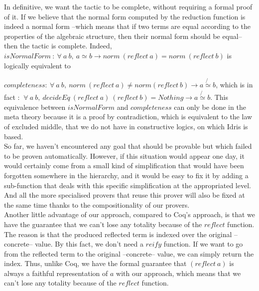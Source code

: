 In definitive, we want the tactic to be complete, without requiring a formal proof of it. If we believe that the normal form computed by the reduction function is indeed a normal form --which means that if two terms are equal according to the properties of the algebraic structure, then their normal form should be equal-- then the tactic is complete.
Indeed, 
$isNormalForm\ :\ \forall\ a\ b,\ a \simeq b \rightarrow norm\ (reflect\ a) = norm\ (reflect\ b)$ is logically equivalent to

$completeness : \ \forall\ a\ b,\ norm\ (reflect\ a) \neq norm(reflect\ b) \rightarrow a \not{\simeq} b$, which is in fact :
$\ \forall\ a\ b,\ decideEq\ (reflect\ a)\ (reflect\ b) = Nothing \rightarrow a \not{\simeq} b$.
This equivalence between $isNormalForm$ and $completeness$ can only be done in the meta theory because it is a proof by contradiction, which is equivalent to the law of excluded middle, that we do not have in constructive logics, on which Idris is based.
\\

So far, we haven't encountered any goal that should be provable but which failed to be proven automatically. However, if this situation would appear one day, it would certainly come from a small kind of simplification that would have been forgotten somewhere in the hierarchy, and it would be easy to fix it by adding a sub-function that deals with this specific simplification at the appropriated level. And all the more specialised provers that reuse this prover will also be fixed at the same time thanks to the compositionality of our provers. 
\\

Another little advantage of our approach, compared to Coq's approach, is that we have the guarantee that we can't lose any totality because of the $reflect$ function. The reason is that the produced reflected term is indexed over the original --concrete-- value. By this fact, we don't need a $reify$ function. If we want to go from the reflected term to the original --concrete-- value, we can simply return the index. Thus, unlike Coq, we have the formal guarantee that $(reflect\ a)$ is always a faithful representation of $a$ with our approach, which means that we can't lose any totality because of the $reflect$ function.

